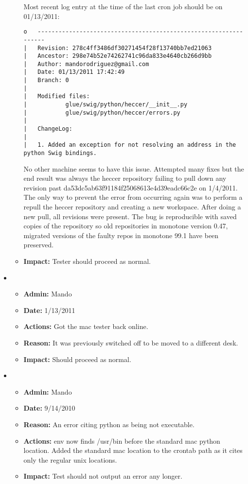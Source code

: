 \documentclass[12pt]{article}
\begin{document}
\begin{itemize}
\begin{itemize}
Most recent log entry at the time of the last cron job should be on 01/13/2011:

\begin{verbatim}
o   -----------------------------------------------------------------
|   Revision: 278c4ff3486df30271454f28f13740bb7ed21063
|   Ancestor: 298e74b52e74262741c96da833e4640cb266d9bb
|   Author: mandorodriguez@gmail.com
|   Date: 01/13/2011 17:42:49
|   Branch: 0
|   
|   Modified files:
|           glue/swig/python/heccer/__init__.py
|           glue/swig/python/heccer/errors.py
|   
|   ChangeLog: 
|   
|   1. Added an exception for not resolving an address in the python Swig bindings.
\end{verbatim}

No other machine seems to have this issue. Attempted many fixes but the end result was always the heccer repository failing to pull down any revision past da53dc5ab63f91184f25068613e4d39eadc66c2e on 1/4/2011.  The only way to prevent the error from occurring again was to perform a repull the heccer repository and creating a new workspace. After doing a new pull, all revisions were present. The bug is reproducible with saved copies of the repository so old repositories in monotone version 0.47, migrated versions of the faulty repos in monotone 99.1 have been preserved.

\item[] {\bf Impact:}  Tester should proceed as normal.
\end{itemize}

\item 
\begin{itemize}
\item[] {\bf Admin:} Mando
\item[] {\bf Date:} 1/13/2011
\item[] {\bf Actions:} Got the mac tester back online.
\item[] {\bf Reason:}  It was previously switched off to be moved to a different desk.
\item[] {\bf Impact:}  Should proceed as normal.
\end{itemize}

\item 
\begin{itemize}
\item[] {\bf Admin:} Mando
\item[] {\bf Date:} 9/14/2010
\item[] {\bf Reason:} An error citing python as being not executable. 
\item[] {\bf Actions:} env now finds /usr/bin before the standard mac python location. Added the standard mac location to the crontab path as it cites only the regular unix locations.
\item[] {\bf Impact:} Test should not output an error any longer.
\end{itemize}
	

\end{itemize}
\end{document}
